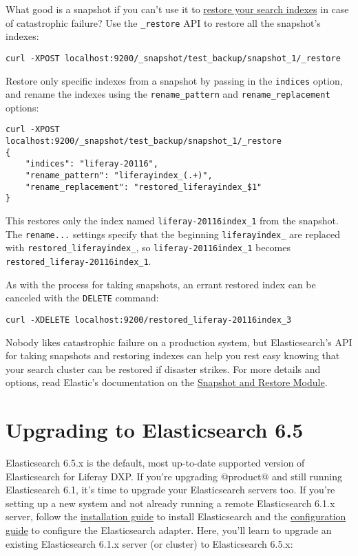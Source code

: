 What good is a snapshot if you can't use it to
\href{https://www.elastic.co/guide/en/elasticsearch/reference/7.x/snapshots-restore-snapshot.html}{restore
your search indexes} in case of catastrophic failure? Use the
\texttt{\_restore} API to restore all the snapshot's indexes:

\begin{verbatim}
curl -XPOST localhost:9200/_snapshot/test_backup/snapshot_1/_restore
\end{verbatim}

Restore only specific indexes from a snapshot by passing in the
\texttt{indices} option, and rename the indexes using the
\texttt{rename\_pattern} and \texttt{rename\_replacement} options:

\begin{verbatim}
curl -XPOST
localhost:9200/_snapshot/test_backup/snapshot_1/_restore
{
    "indices": "liferay-20116",
    "rename_pattern": "liferayindex_(.+)",
    "rename_replacement": "restored_liferayindex_$1"
}
\end{verbatim}

This restores only the index named \texttt{liferay-20116index\_1} from
the snapshot. The \texttt{rename...} settings specify that the beginning
\texttt{liferayindex\_} are replaced with
\texttt{restored\_liferayindex\_}, so \texttt{liferay-20116index\_1}
becomes \texttt{restored\_liferay-20116index\_1}.

As with the process for taking snapshots, an errant restored index can
be canceled with the \texttt{DELETE} command:

\begin{verbatim}
curl -XDELETE localhost:9200/restored_liferay-20116index_3
\end{verbatim}

Nobody likes catastrophic failure on a production system, but
Elasticsearch's API for taking snapshots and restoring indexes can help
you rest easy knowing that your search cluster can be restored if
disaster strikes. For more details and options, read Elastic's
documentation on the
\href{https://www.elastic.co/guide/en/elasticsearch/reference/7.x/snapshot-restore.html}{Snapshot
and Restore Module}.

\chapter{Upgrading to Elasticsearch
6.5}\label{upgrading-to-elasticsearch-6.5}

Elasticsearch 6.5.x is the default, most up-to-date supported version of
Elasticsearch for Liferay DXP. If you're upgrading @product@ and still
running Elasticsearch 6.1, it's time to upgrade your Elasticsearch
servers too. If you're setting up a new system and not already running a
remote Elasticsearch 6.1.x server, follow the
\href{/docs/7-2/deploy/-/knowledge_base/d/installing-elasticsearch}{installation
guide} to install Elasticsearch and the
\href{/docs/7-2/deploy/-/knowledge_base/d/configuring-the-liferay-elasticsearch-connector}{configuration
guide} to configure the Elasticsearch adapter. Here, you'll learn to
upgrade an existing Elasticsearch 6.1.x server (or cluster) to
Elasticsearch 6.5.x:


